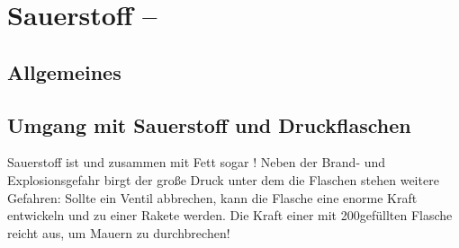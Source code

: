 \documentclass[
ngerman,
paper=a4,
asymmetric,
fontsize=8pt,
draft=false,
numbers=noenddot,
bibtotocnumbered,
footnotes=multiple,
toc=flat,
]{scrbook}
\begin{document}



\section{Sauerstoff -- \texorpdfstring{}{}}
\label{topic:sauerstoff}%
\label{topic:o2}%
%
%




\subsection{Allgemeines}
%





\subsection{Umgang mit Sauerstoff und Druckflaschen}

\TextSlide{\TxGefahren}
{%
Sauerstoff ist  und zusammen mit Fett
sogar ! Neben der Brand- und
Explosionsgefahr birgt der große Druck unter dem die Flaschen
stehen weitere Gefahren: Sollte ein Ventil abbrechen, kann die
Flasche eine enorme Kraft entwickeln und zu einer Rakete
werden. Die Kraft einer mit 200\Bar* gefüllten Flasche reicht
aus, um Mauern zu durchbrechen!


}{
}{}{}{}
\end{document}
